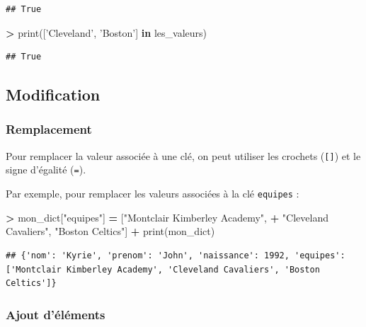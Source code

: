\documentclass[12pt,]{book}
\newenvironment{Shaded}{\begin{snugshade}}{\end{snugshade}}
\newcommand{\KeywordTok}[1]{\textcolor[rgb]{0.13,0.29,0.53}{\textbf{#1}}}
\newcommand{\StringTok}[1]{\textcolor[rgb]{0.31,0.60,0.02}{#1}}
\newcommand{\OperatorTok}[1]{\textcolor[rgb]{0.81,0.36,0.00}{\textbf{#1}}}
\newcommand{\BuiltInTok}[1]{#1}
\newcommand{\NormalTok}[1]{#1}
\numberwithin{equation}{section}
\numberwithin{countremarque}{section}
\begin{document}
\begin{lstlisting}
## True
\end{lstlisting}

\begin{Shaded}
\begin{Highlighting}[]
\OperatorTok{>} \BuiltInTok{print}\NormalTok{([}\StringTok{'Cleveland'}\NormalTok{, }\StringTok{'Boston'}\NormalTok{] }\KeywordTok{in}\NormalTok{ les_valeurs)}
\end{Highlighting}
\end{Shaded}

\begin{lstlisting}
## True
\end{lstlisting}

\subsection{Modification}\label{modification-2}

\subsubsection{Remplacement}\label{remplacement-1}

Pour remplacer la valeur associée à une clé, on peut utiliser les
crochets (\texttt{{[}{]}}) et le signe d'égalité (\texttt{=}).

Par exemple, pour remplacer les valeurs associées à la clé
\texttt{equipes} :

\begin{Shaded}
\begin{Highlighting}[]
\OperatorTok{>}\NormalTok{ mon_dict[}\StringTok{"equipes"}\NormalTok{] }\OperatorTok{=}\NormalTok{ [}\StringTok{"Montclair Kimberley Academy"}\NormalTok{,}
\OperatorTok{+}   \StringTok{"Cleveland Cavaliers"}\NormalTok{, }\StringTok{"Boston Celtics"}\NormalTok{]}
\OperatorTok{+} \BuiltInTok{print}\NormalTok{(mon_dict)}
\end{Highlighting}
\end{Shaded}

\begin{lstlisting}
## {'nom': 'Kyrie', 'prenom': 'John', 'naissance': 1992, 'equipes': ['Montclair Kimberley Academy', 'Cleveland Cavaliers', 'Boston Celtics']}
\end{lstlisting}

\subsubsection{Ajout d'éléments}\label{ajout-delements-1}
\end{document}
